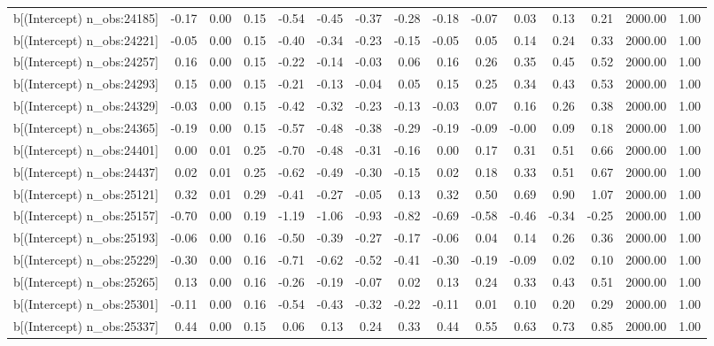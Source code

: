 \begin{table}[ht]
\begin{tabular}{rrrrrrrrrrrrrrr}
  b[(Intercept) n\_obs:24185] & -0.17 & 0.00 & 0.15 & -0.54 & -0.45 & -0.37 & -0.28 & -0.18 & -0.07 & 0.03 & 0.13 & 0.21 & 2000.00 & 1.00 \\ 
  b[(Intercept) n\_obs:24221] & -0.05 & 0.00 & 0.15 & -0.40 & -0.34 & -0.23 & -0.15 & -0.05 & 0.05 & 0.14 & 0.24 & 0.33 & 2000.00 & 1.00 \\ 
  b[(Intercept) n\_obs:24257] & 0.16 & 0.00 & 0.15 & -0.22 & -0.14 & -0.03 & 0.06 & 0.16 & 0.26 & 0.35 & 0.45 & 0.52 & 2000.00 & 1.00 \\ 
  b[(Intercept) n\_obs:24293] & 0.15 & 0.00 & 0.15 & -0.21 & -0.13 & -0.04 & 0.05 & 0.15 & 0.25 & 0.34 & 0.43 & 0.53 & 2000.00 & 1.00 \\ 
  b[(Intercept) n\_obs:24329] & -0.03 & 0.00 & 0.15 & -0.42 & -0.32 & -0.23 & -0.13 & -0.03 & 0.07 & 0.16 & 0.26 & 0.38 & 2000.00 & 1.00 \\ 
  b[(Intercept) n\_obs:24365] & -0.19 & 0.00 & 0.15 & -0.57 & -0.48 & -0.38 & -0.29 & -0.19 & -0.09 & -0.00 & 0.09 & 0.18 & 2000.00 & 1.00 \\ 
  b[(Intercept) n\_obs:24401] & 0.00 & 0.01 & 0.25 & -0.70 & -0.48 & -0.31 & -0.16 & 0.00 & 0.17 & 0.31 & 0.51 & 0.66 & 2000.00 & 1.00 \\ 
  b[(Intercept) n\_obs:24437] & 0.02 & 0.01 & 0.25 & -0.62 & -0.49 & -0.30 & -0.15 & 0.02 & 0.18 & 0.33 & 0.51 & 0.67 & 2000.00 & 1.00 \\ 
  b[(Intercept) n\_obs:25121] & 0.32 & 0.01 & 0.29 & -0.41 & -0.27 & -0.05 & 0.13 & 0.32 & 0.50 & 0.69 & 0.90 & 1.07 & 2000.00 & 1.00 \\ 
  b[(Intercept) n\_obs:25157] & -0.70 & 0.00 & 0.19 & -1.19 & -1.06 & -0.93 & -0.82 & -0.69 & -0.58 & -0.46 & -0.34 & -0.25 & 2000.00 & 1.00 \\ 
  b[(Intercept) n\_obs:25193] & -0.06 & 0.00 & 0.16 & -0.50 & -0.39 & -0.27 & -0.17 & -0.06 & 0.04 & 0.14 & 0.26 & 0.36 & 2000.00 & 1.00 \\ 
  b[(Intercept) n\_obs:25229] & -0.30 & 0.00 & 0.16 & -0.71 & -0.62 & -0.52 & -0.41 & -0.30 & -0.19 & -0.09 & 0.02 & 0.10 & 2000.00 & 1.00 \\ 
  b[(Intercept) n\_obs:25265] & 0.13 & 0.00 & 0.16 & -0.26 & -0.19 & -0.07 & 0.02 & 0.13 & 0.24 & 0.33 & 0.43 & 0.51 & 2000.00 & 1.00 \\ 
  b[(Intercept) n\_obs:25301] & -0.11 & 0.00 & 0.16 & -0.54 & -0.43 & -0.32 & -0.22 & -0.11 & 0.01 & 0.10 & 0.20 & 0.29 & 2000.00 & 1.00 \\ 
  b[(Intercept) n\_obs:25337] & 0.44 & 0.00 & 0.15 & 0.06 & 0.13 & 0.24 & 0.33 & 0.44 & 0.55 & 0.63 & 0.73 & 0.85 & 2000.00 & 1.00 \\ 

\end{tabular}
\end{table}

